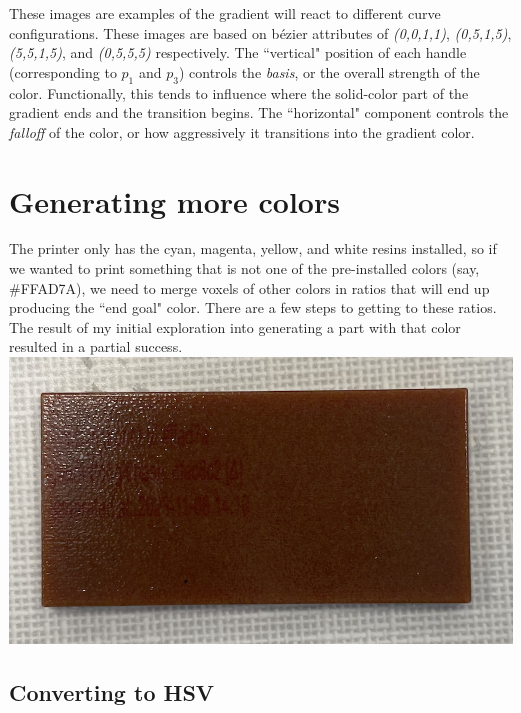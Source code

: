 \documentclass{article}
\begin{document}
\begin{multicols}{2}
\noindent
These images are examples of the gradient will react to different curve configurations. These images are based on b\'ezier attributes of \textit{(0,0,1,1)}, \textit{(0,5,1,5)}, \textit{(5,5,1,5)}, and \textit{(0,5,5,5)} respectively. The ``vertical" position of each handle (corresponding to $p_1$ and $p_3$) controls the \textit{basis}, or the overall strength of the color. Functionally, this tends to influence where the solid-color part of the gradient ends and the transition begins. The ``horizontal" component controls the \textit{falloff} of the color, or how aggressively it transitions into the gradient color.

\section{Generating more colors}

The printer only has the cyan, magenta, yellow, and white resins installed, so if we wanted to print something that is not one of the pre-installed colors (say,  \#FFAD7A), we need to merge voxels of other colors in ratios that will end up producing the ``end goal" color. There are a few steps to getting to these ratios. The result of my initial exploration into generating a part with that color resulted in a partial success.
\\

\noindent
\includegraphics[width=\columnwidth]{ffad7a-result-1}

\subsection{Converting to HSV} \label{converting to hsv}


\end{multicols}
\end{document}
